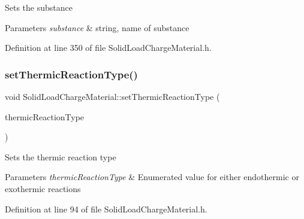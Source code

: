 Sets the substance 
\begin{DoxyParams}{Parameters}
{\em substance} & string, name of substance \\
\hline
\end{DoxyParams}


Definition at line 350 of file Solid\+Load\+Charge\+Material.\+h.

\mbox{\label{class_solid_load_charge_material_ae2f85e0fbeff9f72b808bf86e645797f}} 
\subsubsection{\texorpdfstring{set\+Thermic\+Reaction\+Type()}{setThermicReactionType()}\hspace{0.1cm}{\footnotesize\ttfamily [1/3]}}
{\footnotesize\ttfamily void Solid\+Load\+Charge\+Material\+::set\+Thermic\+Reaction\+Type (\begin{DoxyParamCaption}\item[{\hyperlink{namespace_load_charge_material_a51d4263e865a5d86236622dd3fe23fd1}{Load\+Charge\+Material\+::\+Thermic\+Reaction\+Type}}]{thermic\+Reaction\+Type }\end{DoxyParamCaption})\hspace{0.3cm}{\ttfamily [inline]}}

Sets the thermic reaction type 
\begin{DoxyParams}{Parameters}
{\em thermic\+Reaction\+Type} & Enumerated value for either endothermic or exothermic reactions \\
\hline
\end{DoxyParams}


Definition at line 94 of file Solid\+Load\+Charge\+Material.\+h.

\mbox{\label{class_solid_load_charge_material_ae2f85e0fbeff9f72b808bf86e645797f}} 
